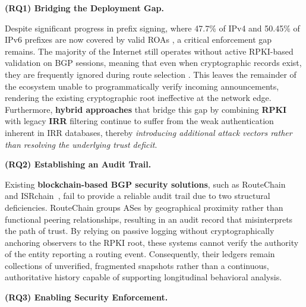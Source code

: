\noindent\textbf{(RQ1) Bridging the Deployment Gap.} 



Despite significant progress in prefix signing, where 47.7\% of IPv4 and 50.45\% of IPv6 prefixes are now covered by valid ROAs \cite{HlavacekSVW23BGPAdopt}, a critical enforcement gap remains. The majority of the Internet still operates without active RPKI-based validation on BGP sessions, meaning that even when cryptographic records exist, they are frequently ignored during route selection . This leaves the remainder of the ecosystem unable to programmatically verify incoming announcements, rendering the existing cryptographic root ineffective at the network edge. Furthermore, \textbf{hybrid approaches} that bridge this gap by combining \textbf{RPKI} with legacy \textbf{IRR} filtering \cite{KangLRKC24IRRedicator} continue to suffer from the weak authentication inherent in IRR databases, thereby \textit{introducing additional attack vectors rather than resolving the underlying trust deficit}.

\noindent \textbf{(RQ2) Establishing an Audit Trail.} 

Existing \textbf{blockchain-based BGP security solutions}, such as RouteChain~\cite{saad2022routechain} and ISRchain~\cite{chen2020isrchain}, fail to provide a reliable audit trail due to two structural deficiencies.  RouteChain groups ASes by geographical proximity rather than functional peering relationships, resulting in an audit record that misinterprets the path of trust.  By relying on passive logging without cryptographically anchoring observers to the RPKI root, these systems cannot verify the authority of the entity reporting a routing event. Consequently, their ledgers remain collections of unverified, fragmented snapshots rather than a continuous, authoritative history capable of supporting longitudinal behavioral analysis.

\noindent \textbf{(RQ3) Enabling Security Enforcement.} 

